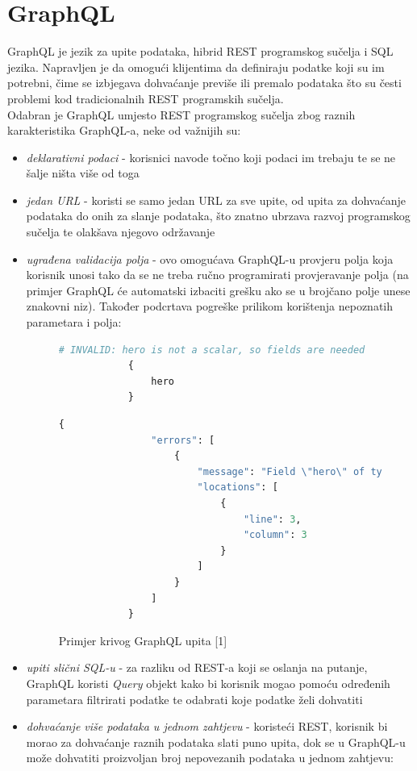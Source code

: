 \documentclass[zavrsnirad]{fer}
\begin{document}
\section{GraphQL}
GraphQL je jezik za upite podataka, hibrid REST programskog sučelja i SQL jezika. Napravljen je da omogući klijentima da definiraju podatke koji su im potrebni, čime se izbjegava dohvaćanje previše ili premalo podataka što su česti problemi kod tradicionalnih REST programskih sučelja.
\\Odabran je GraphQL umjesto REST programskog sučelja zbog raznih karakteristika GraphQL-a, neke od važnijih su:
 \begin{itemize}
 	\item \textit{deklarativni podaci} - korisnici navode točno koji podaci im trebaju te se ne šalje ništa više od toga
 	\item \textit{jedan URL} - koristi se samo jedan URL za sve upite, od upita za dohvaćanje podataka do onih za slanje podataka, što znatno ubrzava razvoj programskog sučelja te olakšava njegovo održavanje
 	\item \textit{ugrađena validacija polja} - ovo omogućava GraphQL-u provjeru polja koja korisnik unosi tako da se ne treba ručno programirati provjeravanje polja (na primjer GraphQL će automatski izbaciti grešku ako se u brojčano polje unese znakovni niz). Također podcrtava pogreške prilikom korištenja nepoznatih parametara i polja:

	\begin{figure}[htb]
		\centering
		 	\begin{lstlisting}[language=GraphQL]
			# INVALID: hero is not a scalar, so fields are needed
			{
				hero
			}
		\end{lstlisting}
		\begin{lstlisting}[language=GraphQL]
			{
				"errors": [
					{
						"message": "Field \"hero\" of type \"Character\" must have a selection of subfields. Did you mean \"hero { ... }\"?",
						"locations": [
							{
								"line": 3,
								"column": 3
							}
						]
					}
				]
			}
		\end{lstlisting}
		\caption{Primjer krivog GraphQL upita [1]}
	\end{figure}
	\FloatBarrier

 	\item \textit{upiti slični SQL-u} - za razliku od REST-a koji se oslanja na putanje, GraphQL koristi \textit{Query} objekt kako bi korisnik mogao pomoću određenih parametara filtrirati podatke te odabrati koje podatke želi dohvatiti
 	\item \textit{dohvaćanje više podataka u jednom zahtjevu} - koristeći REST, korisnik bi morao za dohvaćanje raznih podataka slati puno upita, dok se u GraphQL-u može dohvatiti proizvoljan broj nepovezanih podataka u jednom zahtjevu:


\end{itemize}
\end{document}
